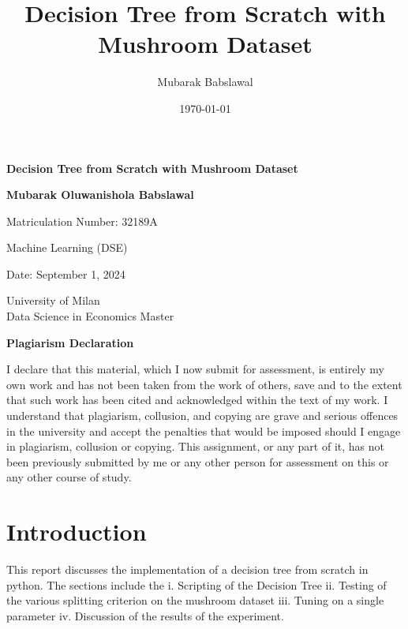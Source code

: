 \documentclass{article}
\title{Decision Tree from Scratch with Mushroom Dataset}
\author{Mubarak Babslawal}
\date{\today}
\begin{document}
\begin{titlepage}
    \centering
    \vspace*{2cm}

    \Huge
    \textbf{Decision Tree from Scratch with Mushroom Dataset}

    \vspace{1.5cm}
    
    \LARGE
    \textbf{Mubarak Oluwanishola Babslawal}
    
    \vspace{0.5cm}
    \Large
    Matriculation Number: 32189A

    \vfill
    
    \Large
    Machine Learning (DSE)
    
    \vspace{0.8cm}
    
    \Large
    Date: September 1, 2024
    
    \vspace{1cm}

    \Large
    University of Milan\\
    Data Science in Economics Master

\end{titlepage}

\newpage
\thispagestyle{empty}

\begin{center}
    \huge
    \textbf{Plagiarism Declaration}
\end{center}

\vspace{1.5cm}

\noindent


    \Large
    I declare that this material, which I now submit for assessment, is entirely my own work and has not been taken from the work of others, save and to the extent that such work has been cited and acknowledged within the text of my work. I understand that plagiarism, collusion, and copying are grave and serious offences in the university and accept the penalties that would be imposed should I engage in plagiarism, collusion or copying. This assignment, or any part of it, has not been previously submitted by me or any other person for assessment on this or any other course of study.
\newpage

\large

\section{Introduction}
This report discusses the implementation of a decision tree from scratch in python. The sections include the 
i. Scripting of the Decision Tree
ii. Testing of the various splitting criterion on the mushroom dataset 
iii. Tuning on a single parameter 
iv. Discussion of the results of the experiment.
\end{document}
